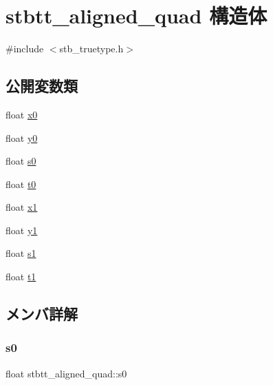 \hypertarget{structstbtt__aligned__quad}{}\section{stbtt\+\_\+aligned\+\_\+quad 構造体}
\label{structstbtt__aligned__quad}


{\ttfamily \#include $<$stb\+\_\+truetype.\+h$>$}

\subsection*{公開変数類}
\begin{DoxyCompactItemize}
\item 
float \mbox{\hyperlink{structstbtt__aligned__quad_ad74fd8fd69f8a8e1bd20cb0ab7df6e2e}{x0}}
\item 
float \mbox{\hyperlink{structstbtt__aligned__quad_a6178a6b380cf6889893afaeb5019ecd6}{y0}}
\item 
float \mbox{\hyperlink{structstbtt__aligned__quad_ac23b153ff4042deb5499e5a8cacf4a59}{s0}}
\item 
float \mbox{\hyperlink{structstbtt__aligned__quad_a921cd13638a8b3a1e0729021d371da49}{t0}}
\item 
float \mbox{\hyperlink{structstbtt__aligned__quad_a43a7eeac24238e289f825e644331dee6}{x1}}
\item 
float \mbox{\hyperlink{structstbtt__aligned__quad_a66ee8061da982804073a3d2a9114e53c}{y1}}
\item 
float \mbox{\hyperlink{structstbtt__aligned__quad_a26360efee3cdfb5aa2bdc593157b436b}{s1}}
\item 
float \mbox{\hyperlink{structstbtt__aligned__quad_ae1f5ed7333ca5bba46c6a098a05ac75b}{t1}}
\end{DoxyCompactItemize}


\subsection{メンバ詳解}
\mbox{\label{structstbtt__aligned__quad_ac23b153ff4042deb5499e5a8cacf4a59}} 
\subsubsection{\texorpdfstring{s0}{s0}}
{\footnotesize\ttfamily float stbtt\+\_\+aligned\+\_\+quad\+::s0}

